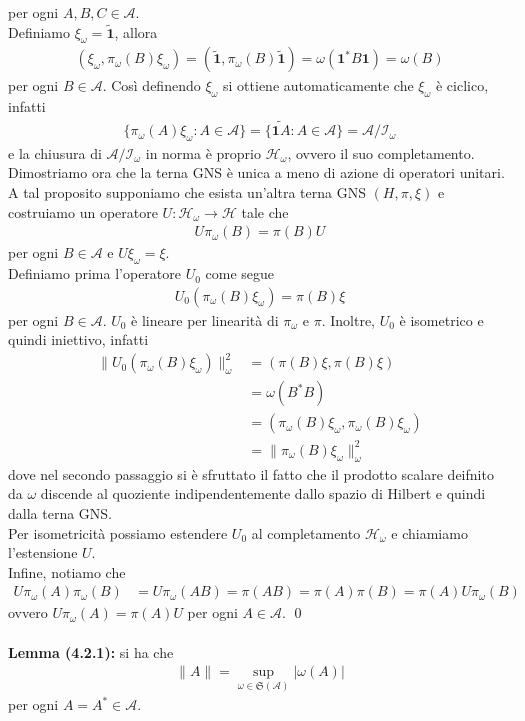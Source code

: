 \documentclass{article}
\numberwithin{equation}{subsection}
\begin{document}
per ogni $A, B, C \in \mathscr{A}$. \\
Definiamo $\xi_\omega = \widetilde{\mathbf{1}}$, allora
\begin{align*}
    (\xi_\omega, \pi_\omega(B)\xi_\omega) = (\widetilde{\mathbf{1}}, \pi_\omega(B)\widetilde{\mathbf{1}}) = \omega(\mathbf{1}^*B\mathbf{1}) = \omega(B)
\end{align*}
per ogni $B \in \mathscr{A}$. Così definendo $\xi_\omega$ si ottiene automaticamente che $\xi_\omega$ è ciclico, infatti
\begin{align*}
    \{\pi_\omega(A)\xi_\omega : A \in \mathscr{A}\} = \{\widetilde{\mathbf{1}A} : A \in \mathscr{A}\} = \mathscr{A}/\mathscr{I}_\omega
\end{align*}
e la chiusura di $\mathscr{A}/\mathscr{I}_\omega$ in norma è proprio $\mathcal{H}_\omega$, ovvero il suo completamento. \\
Dimostriamo ora che la terna GNS è unica a meno di azione di operatori unitari. A tal proposito supponiamo che esista un'altra terna GNS $(H, \pi, \xi)$ e costruiamo un operatore $U : \mathcal{H}_\omega \longrightarrow \mathcal{H}$ tale che
\begin{align*}
    U\pi_\omega(B) = \pi(B)U
\end{align*}
per ogni $B \in \mathscr{A}$ e $U\xi_\omega = \xi$. \\
Definiamo prima l'operatore $U_0$ come segue
\begin{align*}
    U_0(\pi_\omega(B)\xi_\omega) = \pi(B)\xi
\end{align*}
per ogni $B \in \mathscr{A}$. $U_0$ è lineare per linearità di $\pi_\omega$ e $\pi$. Inoltre, $U_0$ è isometrico e quindi iniettivo, infatti
\begin{align*}
    \|U_0(\pi_\omega(B)\xi_\omega)\|^2_\omega &= (\pi(B)\xi, \pi(B)\xi) \\
    &= \omega(B^*B) \\
    &= (\pi_\omega(B)\xi_\omega, \pi_\omega(B)\xi_\omega) \\
    &= \|\pi_\omega(B)\xi_\omega\|^2_\omega
\end{align*}
dove nel secondo passaggio si è sfruttato il fatto che il prodotto scalare deifnito da $\omega$ discende al quoziente indipendentemente dallo spazio di Hilbert e quindi dalla terna GNS. \\
Per isometricità possiamo estendere $U_0$ al completamento $\mathcal{H}_\omega$ e chiamiamo l'estensione $U$. \\
Infine, notiamo che
\begin{align*}
    U\pi_\omega(A)\pi_\omega(B) &= U\pi_\omega(AB) = \pi(AB) = \pi(A)\pi(B) = \pi(A)U\pi_\omega(B)
\end{align*}
ovvero $U\pi_\omega(A) = \pi(A)U$ per ogni $A \in \mathscr{A}$. \qed \\ \\
\textbf{Lemma (4.2.1):} si ha che
\begin{align*}
    \|A\| = \sup_{\omega \in \mathfrak{S}(\mathscr{A})} |\omega(A)|
\end{align*}
per ogni $A = A^* \in \mathscr{A}$. \\
\end{document}
